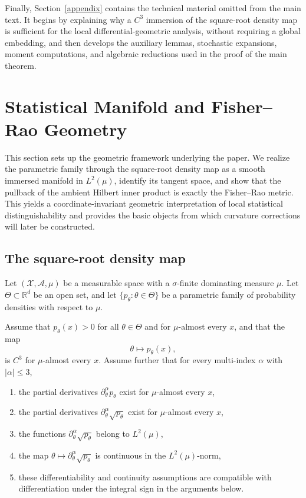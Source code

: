 \documentclass[11pt,letterpaper]{amsart}
\numberwithin{equation}{section}
\theoremstyle{plain}
\theoremstyle{definition}
\theoremstyle{remark}
\begin{document}
Finally, Section~\ref{appendix} contains the technical material omitted from the main text. It begins by explaining why a \(C^3\) immersion of the square-root density map is sufficient for the local differential-geometric analysis, without requiring a global embedding, and then develops the auxiliary lemmas, stochastic expansions, moment computations, and algebraic reductions used in the proof of the main theorem.



\section{Statistical Manifold and Fisher--Rao Geometry}\label{stat_manifold}

This section sets up the geometric framework underlying the paper. We realize the parametric family through the square-root density map as a smooth immersed manifold in \(L^2(\mu)\), identify its tangent space, and show that the pullback of the ambient Hilbert inner product is exactly the Fisher--Rao metric. This yields a coordinate-invariant geometric interpretation of local statistical distinguishability and provides the basic objects from which curvature corrections will later be constructed.

\subsection{The square-root density map}

Let \((\mathcal X,\mathcal A,\mu)\) be a measurable space with a \(\sigma\)-finite dominating measure \(\mu\). Let \(\Theta\subset\mathbb R^d\) be an open set, and let \(\{p_\theta:\theta\in\Theta\}\) be a parametric family of probability densities with respect to \(\mu\).

Assume that \(p_\theta(x)>0\) for all \(\theta\in\Theta\) and for \(\mu\)-almost every \(x\), and that the map
\[
\theta\mapsto p_\theta(x),
\]
is \(C^3\) for \(\mu\)-almost every \(x\). Assume further that for every multi-index \(\alpha\) with \(|\alpha|\le 3\),

\begin{enumerate}
    \item the partial derivatives \(\partial_\theta^\alpha p_\theta\) exist for \(\mu\)-almost every \(x\),
    \item the partial derivatives \(\partial_\theta^\alpha \sqrt{p_\theta}\) exist for \(\mu\)-almost every \(x\),
    \item the functions \(\partial_\theta^\alpha \sqrt{p_\theta}\) belong to \(L^2(\mu)\),
    \item the map \(\theta\mapsto \partial_\theta^\alpha\sqrt{p_\theta}\) is continuous in the \(L^2(\mu)\)-norm,
    \item these differentiability and continuity assumptions are compatible with differentiation under the integral sign in the arguments below.
\end{enumerate}
\end{document}
